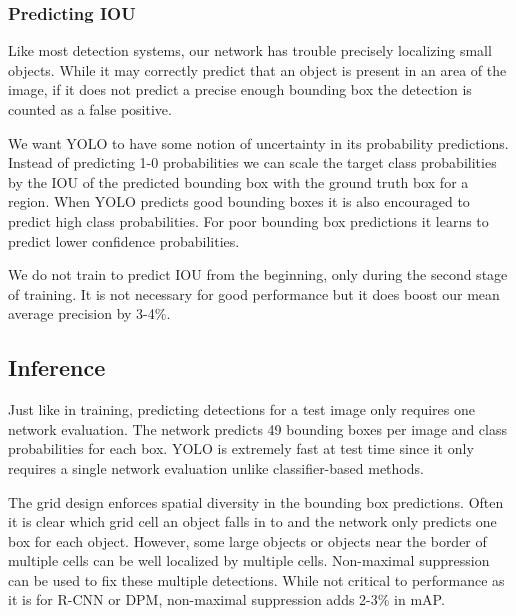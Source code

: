 \documentclass{article} %
\begin{document}
\subsubsection{Predicting IOU}

Like most detection systems, our network has trouble precisely localizing small objects. While it may correctly predict that an object is present in an area of the image, if it does not predict a precise enough bounding box the detection is counted as a false positive.

We want YOLO to have some notion of uncertainty in its probability predictions. Instead of predicting 1-0 probabilities we can scale the target class probabilities by the IOU of the predicted bounding box with the ground truth box for a region. When YOLO predicts good bounding boxes it is also encouraged to predict high class probabilities. For poor bounding box predictions it learns to predict lower confidence probabilities.

We do not train to predict IOU from the beginning, only during the second stage of training. It is not necessary for good performance but it does boost our mean average precision by 3-4\%.

\subsection{Inference}

Just like in training, predicting detections for a test image only requires one network evaluation. The network predicts 49 bounding boxes per image and class probabilities for each box. YOLO is extremely fast at test time since it only requires a single network evaluation unlike classifier-based methods.

The grid design enforces spatial diversity in the bounding box predictions. Often it is clear which grid cell an object falls in to and the network only predicts one box for each object. However, some large objects or objects near the border of multiple cells can be well localized by multiple cells. Non-maximal suppression can be used to fix these multiple detections. While not critical to performance as it is for R-CNN or DPM, non-maximal suppression adds 2-3\% in mAP.

\end{document}
